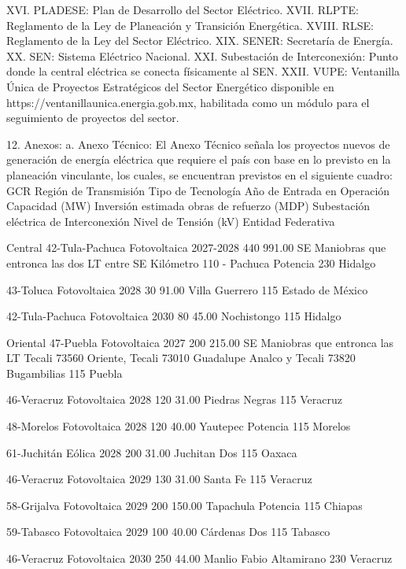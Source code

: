 XVI.	PLADESE: Plan de Desarrollo del Sector Eléctrico.
XVII.	RLPTE: Reglamento de la Ley de Planeación y Transición Energética.
XVIII.	RLSE: Reglamento de la Ley del Sector Eléctrico.
XIX.	SENER: Secretaría de Energía.
XX.	SEN: Sistema Eléctrico Nacional.
XXI.	Subestación de Interconexión: Punto donde la central eléctrica se conecta físicamente al SEN.
XXII.	VUPE: Ventanilla Única de Proyectos Estratégicos del Sector Energético disponible en https://ventanillaunica.energia.gob.mx, habilitada como un módulo para el seguimiento de proyectos del sector.\par
12. Anexos:
a. Anexo Técnico:
El Anexo Técnico señala los proyectos nuevos de generación de energía eléctrica que requiere el país con base en lo previsto en la planeación vinculante, los cuales, se encuentran previstos en el siguiente cuadro:
GCR
 Región de Transmisión
 Tipo de Tecnología
 Año de Entrada en Operación
 Capacidad (MW)
 Inversión estimada obras de refuerzo (MDP)
 Subestación eléctrica de Interconexión
 Nivel de Tensión (kV)
 Entidad Federativa
 
 Central
 42-Tula-Pachuca
 Fotovoltaica
 2027-2028
 440
 991.00
 SE Maniobras que entronca las dos LT entre SE Kilómetro 110 - Pachuca Potencia
 230
 Hidalgo
 
 
 43-Toluca
 Fotovoltaica
 2028
 30
 91.00
 Villa Guerrero
 115
 Estado de México
 
 
 42-Tula-Pachuca
 Fotovoltaica
 2030
 80
 45.00
 Nochistongo
 115
 Hidalgo
 
 Oriental
 47-Puebla
 Fotovoltaica
 2027
 200
 215.00
 SE Maniobras que entronca las LT Tecali 73560 Oriente, Tecali 73010 Guadalupe Analco y Tecali 73820 Bugambilias
 115
 Puebla
 
 
 46-Veracruz
 Fotovoltaica
 2028
 120
 31.00
 Piedras Negras
 115
 Veracruz
 
 
 48-Morelos
 Fotovoltaica
 2028
 120
 40.00
 Yautepec Potencia
 115
 Morelos
 
 
 61-Juchitán
 Eólica
 2028
 200
 31.00
 Juchitan Dos
 115
 Oaxaca
 
 
 46-Veracruz
 Fotovoltaica
 2029
 130
 31.00
 Santa Fe
 115
 Veracruz
 
 
 58-Grijalva
 Fotovoltaica
 2029
 200
 150.00
 Tapachula Potencia
 115
 Chiapas
 
 
 59-Tabasco
 Fotovoltaica
 2029
 100
 40.00
 Cárdenas Dos
 115
 Tabasco
 
 
 46-Veracruz
 Fotovoltaica
 2030
 250
 44.00
 Manlio Fabio Altamirano
 230
 Veracruz
 
